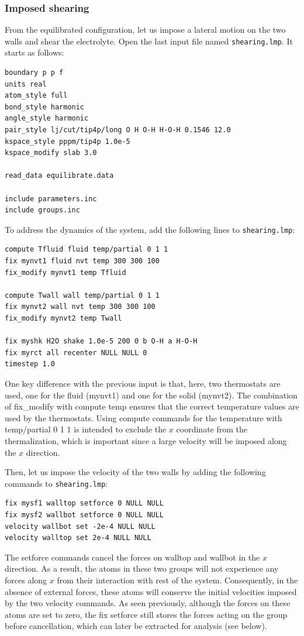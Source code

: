 \documentclass[9pt,tutorial]{livecoms}
\newcommand{\lmpcmd}[1]{\colorbox{listing}{\textcolor{command}{\small{#1}}}} %
\newcommand{\flecmd}[1]{\textcolor{command}{\texttt{#1}}} %
\begin{document}
\subsubsection{Imposed shearing}

From the equilibrated configuration, let us impose a lateral motion on the two
walls and shear the electrolyte.  Open the last input file named \flecmd{shearing.lmp}.
It starts as follows:
\begin{lstlisting}
boundary p p f
units real
atom_style full
bond_style harmonic
angle_style harmonic
pair_style lj/cut/tip4p/long O H O-H H-O-H 0.1546 12.0
kspace_style pppm/tip4p 1.0e-5
kspace_modify slab 3.0

read_data equilibrate.data

include parameters.inc
include groups.inc
\end{lstlisting}

To address the dynamics of the system, add the following lines to
\flecmd{shearing.lmp}:
\begin{lstlisting}
compute Tfluid fluid temp/partial 0 1 1
fix mynvt1 fluid nvt temp 300 300 100
fix_modify mynvt1 temp Tfluid

compute Twall wall temp/partial 0 1 1
fix mynvt2 wall nvt temp 300 300 100
fix_modify mynvt2 temp Twall

fix myshk H2O shake 1.0e-5 200 0 b O-H a H-O-H
fix myrct all recenter NULL NULL 0
timestep 1.0
\end{lstlisting}

One key difference with the previous input is that, here, two thermostats are used,
one for the fluid (\lmpcmd{mynvt1}) and one for the solid (\lmpcmd{mynvt2}).
The combination of \lmpcmd{fix\_modify} with \lmpcmd{compute temp} ensures
that the correct temperature values are used by the thermostats.  Using
\lmpcmd{compute} commands for the temperature with \lmpcmd{temp/partial 0 1 1} is
intended to exclude the $x$ coordinate from the thermalization, which is important since a
large velocity will be imposed along the $x$ direction.

Then, let us impose the velocity of the two walls by adding the following
commands to \flecmd{shearing.lmp}:
\begin{lstlisting}
fix mysf1 walltop setforce 0 NULL NULL
fix mysf2 wallbot setforce 0 NULL NULL
velocity wallbot set -2e-4 NULL NULL
velocity walltop set 2e-4 NULL NULL
\end{lstlisting}
The \lmpcmd{setforce} commands cancel the forces on \lmpcmd{walltop} and
\lmpcmd{wallbot} in the $x$ direction.  As a result, the atoms in these two groups will not
experience any forces along $x$ from their interaction with rest of the system.  Consequently, in the absence of
external forces, these atoms will conserve the initial velocities imposed by the
two \lmpcmd{velocity} commands.  As seen previously, although the
forces on these atoms are set to zero, the \lmpcmd{fix setforce} still stores the
forces acting on the group before cancellation, which can later be extracted
for analysis (see below).
\end{document}

